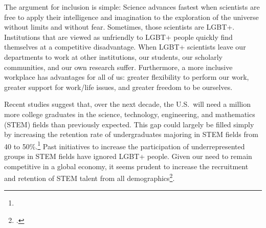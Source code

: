 \begin{titlepage}
The argument for inclusion is simple:  Science advances fastest when scientists are free to apply their intelligence and imagination to the exploration of the universe without limits and without fear.  Sometimes, those scientists are LGBT+.  Institutions that are viewed as unfriendly to LGBT+ people quickly find themselves at a competitive disadvantage.  When LGBT+ scientists leave our departments to work at other institutions, our students, our scholarly communities, and our own research suffer.  Furthermore, a more inclusive workplace has advantages for all of us: greater flexibility to perform our work, greater support for work/life issues, and greater freedom to be ourselves. \vspace*{\baselineskip}

Recent studies suggest that, over the next decade, the U.S.\ will need a million more college graduates in the science, technology, engineering, and mathematics (STEM) fields than previously expected.  This gap could largely be filled simply by increasing the retention rate of undergraduates majoring in STEM fields from 40 to 50\%.\footnote{}  Past initiatives to increase the participation of underrepresented groups in STEM fields have ignored LGBT+ people.  Given our need to remain competitive in a global economy, it seems prudent to increase the recruitment and retention of STEM talent from all demographics\footnote{.}. \vspace*{\baselineskip}


\end{titlepage}
